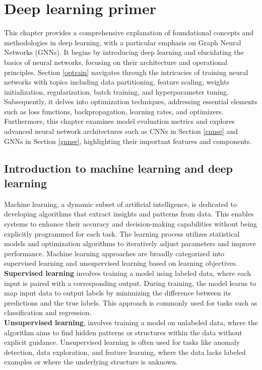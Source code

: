 \chapter{Deep learning primer}
\label{chap:Theory-Deep Learning}
This chapter provides a comprehensive explanation of foundational concepts and methodologies in deep learning, with a particular emphasis on Graph Neural Networks (GNNs). It begins by introducing deep learning and elucidating the basics of neural networks, focusing on their architecture and operational principles. Section \ref{optrain} navigates through the intricacies of training neural networks with topics including data partitioning, feature scaling, weights initialization, regularization, batch training, and hyperparameter tuning. Subsequently, it delves into optimization techniques, addressing essential elements such as loss functions, backpropagation, learning rates, and optimizers. Furthermore, this chapter examines model evaluation metrics and explores advanced neural network architectures such as CNNs in Section \ref{cnnse} and GNNs in Section \ref{gnnse}, highlighting their important features and components. 

\section{Introduction to machine learning and deep learning}
Machine learning, a dynamic subset of artificial intelligence, is dedicated to developing algorithms that extract insights and patterns from data. This enables systems to enhance their accuracy and decision-making capabilities without being explicitly programmed for each task. The learning process utilizes statistical models and optimization algorithms to iteratively adjust parameters and improve performance. Machine learning approaches are broadly categorized into supervised learning and unsupervised learning based on learning objectives. \\

\textbf{Supervised learning} involves training a model using labeled data, where each input is paired with a corresponding output. During training, the model learns to map input data to output labels by minimizing the difference between its predictions and the true labels. This approach is commonly used for tasks such as classification and regression. \\

\textbf{Unsupervised learning}, involves training a model on unlabeled data, where the algorithm aims to find hidden patterns or structures within the data without explicit guidance. Unsupervised learning is often used for tasks like anomaly detection, data exploration, and feature learning, where the data lacks labeled examples or where the underlying structure is unknown. \\

